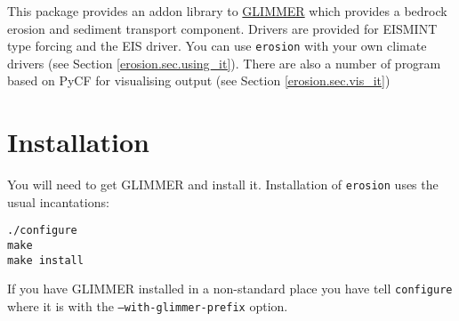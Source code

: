 This package provides an addon library to \href{http://glimmer.forge.nesc.ac.uk/}{GLIMMER} which provides a bedrock erosion and sediment transport component. Drivers are provided for EISMINT type forcing and the EIS driver. You can use \texttt{erosion} with your own climate drivers (see Section \ref{erosion.sec.using_it}). There are also a number of program based on PyCF for visualising output (see Section \ref{erosion.sec.vis_it})

\section{Installation}
You will need to get GLIMMER and install it. Installation of \texttt{erosion} uses the usual incantations:
\begin{verbatim}
./configure 
make
make install
\end{verbatim}
If you have GLIMMER installed in a non-standard place you have tell \texttt{configure} where it is with the \texttt{--with-glimmer-prefix} option.

